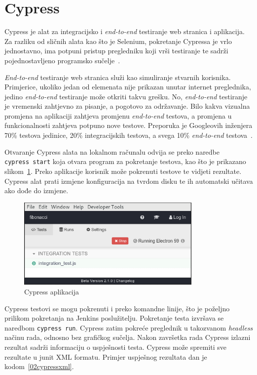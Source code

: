 
\section{Cypress}
Cypress je alat za integracijsko i \textit{end-to-end} testiranje web stranica i aplikacija. Za
razliku od sličnih alata kao što je Selenium, pokretanje Cypressa je vrlo jednostavno, ima potpuni
pristup pregledniku koji vrši testiranje te sadrži pojednostavljeno programsko
sučelje~\citep{Cypress}.

\textit{End-to-end} testiranje web stranica služi kao simuliranje stvarnih korisnika. Primjerice,
ukoliko jedan od elemenata nije prikazan unutar internet preglednika, jedino \textit{end-to-end}
testiranje može otkriti takvu grešku. No, \textit{end-to-end} testiranje je vremenski zahtjevno za
pisanje, a pogotovo za održavanje. Bilo kakva vizualna promjena na aplikaciji zahtjeva promjenu
\textit{end-to-end} testova, a promjena u funkcionalnosti zahtjeva potpuno nove testove. Preporuka
je Googleovih inženjera 70\% testova jedinice, 20\% integracijskih testova, a svega 10\%
\textit{end-to-end} testova~\citep{google-2015}.

Otvaranje Cypress alata na lokalnom računalu odvija se preko naredbe \texttt{cypress~start} koja
otvara program za pokretanje testova, kao što je prikazano slikom~\ref{fig:02cypress}. Preko
aplikacije korisnik može pokrenuti testove te vidjeti rezultate. Cypress alat prati izmjene
konfiguracija na tvrdom disku te ih automatski učitava ako dođe do izmjene.

\begin{figure}[h]
    \centering
    \includegraphics[width=0.8\textwidth]{img/02/cypress.png}
    \caption{Cypress aplikacija}%
    \label{fig:02cypress}
\end{figure}

Cypress testovi se mogu pokrenuti i preko komandne linije, što je poželjno prilikom pokretanja na
Jenkins poslužitelju. Pokretanje testa izvršava se naredbom \texttt{cypress~run}. Cypress zatim
pokreće preglednik u takozvanom \textit{headless} načinu rada, odnosno bez grafičkog sučelja. Nakon
završetka rada Cypress izlazni rezultat sadrži informaciju o uspješnosti testa. Cypress može
spremiti sve rezultate u junit XML formatu. Primjer uspješnog rezultata dan je
kodom~\ref{02cypressxml}.


